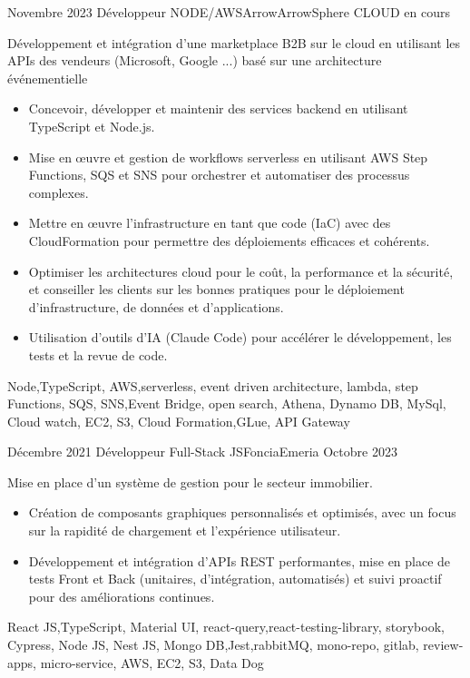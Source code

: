 %
%
%
\begin{experiences}
\experience
  {Novembre 2023}  {Développeur NODE/AWS}{Arrow}{ArrowSphere CLOUD}
  {en cours}   {
                      Développement et intégration d'une marketplace B2B sur le cloud en utilisant les APIs des vendeurs (Microsoft, Google ...) basé sur une architecture événementielle 
                      \begin{itemize}
                        \item Concevoir, développer et maintenir des services backend en utilisant TypeScript et Node.js.
                        \item Mise en œuvre et gestion de workflows serverless en utilisant AWS Step Functions, SQS et SNS pour orchestrer et automatiser des processus complexes.
                        \item Mettre en œuvre l'infrastructure en tant que code (IaC) avec des CloudFormation pour permettre des déploiements efficaces et cohérents.
                        \item Optimiser les architectures cloud pour le coût, la performance et la sécurité, et conseiller les clients sur les bonnes pratiques pour le déploiement d'infrastructure, de données et d'applications.
                        \item Utilisation d'outils d'IA (Claude Code) pour accélérer le développement, les tests et la revue de code.
                      \end{itemize}
                  }
                  {Node,TypeScript, AWS,serverless, event driven architecture, lambda, step Functions, SQS, SNS,Event Bridge, open search, Athena, Dynamo DB, MySql, Cloud watch, EC2, S3, Cloud Formation,GLue,  API Gateway}  
                
  \emptySeparator   
\experience
  {Décembre 2021}  {Développeur Full-Stack JS}{Foncia}{Emeria}
  {Octobre 2023}   {
                      Mise en place d'un système de gestion pour le secteur immobilier.
                      \begin{itemize}
                        \item Création de composants graphiques personnalisés et optimisés, avec un focus sur la rapidité de chargement et l'expérience utilisateur.
                        \item Développement et intégration d’APIs REST performantes, mise en place de tests Front et Back (unitaires, d'intégration, automatisés) et suivi proactif pour des améliorations continues.
                      \end{itemize}
                  }
                  {React JS,TypeScript, Material UI, react-query,react-testing-library, storybook, Cypress, Node JS, Nest JS, Mongo DB,Jest,rabbitMQ, mono-repo, gitlab, review-apps, micro-service, AWS, EC2, S3, Data Dog}  
                

\end{experiences}
